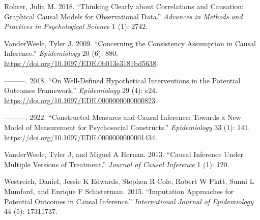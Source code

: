 \documentclass[
  singlecolumn]{report}
\newlength{\cslhangindent}
\newlength{\cslentryspacingunit} %
\newenvironment{CSLReferences}[2] %
 {%
  \setlength{\parindent}{0pt}
  \ifodd #1
  \let\oldpar\par
  \def\par{\hangindent=\cslhangindent\oldpar}
  \fi
  \setlength{\parskip}{#2\cslentryspacingunit}
 }%
 {}
\begin{document}
\begin{CSLReferences}{1}{0}
\leavevmode{}%
Rohrer, Julia M. 2018. {``Thinking Clearly about Correlations and
Causation: Graphical Causal Models for Observational Data.''}
\emph{Advances in Methods and Practices in Psychological Science} 1 (1):
2742.

\leavevmode{}%
VanderWeele, Tyler J. 2009. {``Concerning the Consistency Assumption in
Causal Inference.''} \emph{Epidemiology} 20 (6): 880.
\url{https://doi.org/10.1097/EDE.0b013e3181bd5638}.

\leavevmode{}%
---------. 2018. {``On Well-Defined Hypothetical Interventions in the
Potential Outcomes Framework.''} \emph{Epidemiology} 29 (4): e24.
\url{https://doi.org/10.1097/EDE.0000000000000823}.

\leavevmode{}%
---------. 2022. {``Constructed Measures and Causal Inference: Towards a
New Model of Measurement for Psychosocial Constructs.''}
\emph{Epidemiology} 33 (1): 141.
\url{https://doi.org/10.1097/EDE.0000000000001434}.

\leavevmode{}%
VanderWeele, Tyler J, and Miguel A Hernan. 2013. {``Causal Inference
Under Multiple Versions of Treatment.''} \emph{Journal of Causal
Inference} 1 (1): 120.

\leavevmode{}%
Westreich, Daniel, Jessie K Edwards, Stephen R Cole, Robert W Platt,
Sunni L Mumford, and Enrique F Schisterman. 2015. {``Imputation
Approaches for Potential Outcomes in Causal Inference.''}
\emph{International Journal of Epidemiology} 44 (5): 17311737.

\end{CSLReferences}
\end{document}
